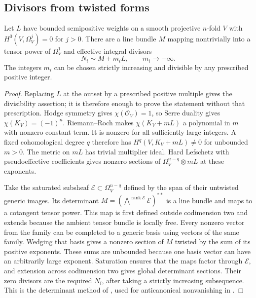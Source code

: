 \subsection{Divisors from twisted forms}

\begin{lemma}\label{g:determinant}\label{rb:determinant}
Let $L$ have bounded semipositive weights on a smooth projective
$n$-fold $V$ with $H^0(V,\Omega_V^j)=0$ for $j>0$.  There are a line
bundle $M$ mapping nontrivially into a tensor power of $\Omega_V^1$ and
effective integral divisors
\[
                       N_i\sim M+m_iL,
                       \qquad m_i\longrightarrow+\infty.
\]
The integers $m_i$ can be chosen strictly increasing and divisible by any prescribed positive integer.
\end{lemma}

\begin{proof}
Replacing $L$ at the outset by a prescribed positive multiple gives the divisibility assertion; it is therefore enough to prove the statement without that prescription. Hodge symmetry gives $\chi(\mathcal O_V)=1$, so Serre duality gives
$\chi(K_V)=(-1)^n$.  Riemann--Roch makes $\chi(K_V+mL)$ a polynomial
in $m$ with nonzero constant term.  It is nonzero for all sufficiently
large integers.  A fixed cohomological degree $q$ therefore has
$H^q(V,K_V+mL)\ne0$ for unbounded $m>0$.  The metric on $mL$ has trivial
multiplier ideal.  Hard Lefschetz with pseudoeffective coefficients
\cite[Theorem~0.1]{DPS2001} gives nonzero sections of
$\Omega_V^{n-q}\otimes mL$ at these exponents.

Take the saturated subsheaf $\mathcal E\subset\Omega_V^{n-q}$ defined
by the span of their untwisted generic images.  Its determinant
$M=(\bigwedge^{\operatorname{rank}\mathcal E}\mathcal E)^{**}$ is a line
bundle and maps to a cotangent tensor power.  This map is first defined
outside codimension two and extends because the ambient tensor bundle
is locally free.  Every nonzero vector from the family can be completed
to a generic basis using vectors of the same family.  Wedging that
basis gives a nonzero section of $M$ twisted by the sum of its positive
exponents.  These sums are unbounded because one basis vector can
have an arbitrarily large exponent.  Saturation ensures that the
maps factor through $\mathcal E$, and extension across codimension two
gives global determinant sections.  Their zero divisors are the
required $N_i$, after taking a strictly increasing subsequence.  This
is the determinant method of \cite[Lemma~4.1]{LP2018}, used for
anticanonical nonvanishing in \cite[Lemma~5.1]{LMPTX2023}.
\end{proof}
